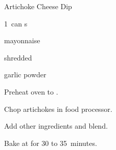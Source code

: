 \begin{recipe}{Artichoke Cheese Dip}{}{}

\begin{ingredients}
\item 1~can s
\item {} mayonnaise
\item \C{1\half} shredded 
\item {} 
\item {} garlic powder
\end{ingredients}

\begin{directions}
\item Preheat oven to .
\item Chop artichokes in food processor.
\item Add other ingredients and blend.
\item Bake at  for 30 to 35~minutes.
\end{directions}

\end{recipe}
